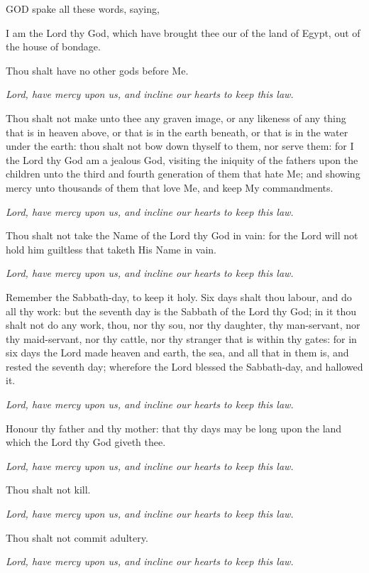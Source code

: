 GOD spake all these words, saying, \par
I am the Lord thy God, which have brought thee our of the land of Egypt, out of the house of bondage. \par
Thou shalt have no other gods before Me.

\textit{Lord, have mercy upon us, and incline our hearts to keep this law.}

Thou shalt not make unto thee any graven image, or any likeness of any thing that is in heaven above, or that is in the earth beneath, or that is in the water under the earth: thou shalt not bow down thyself to them, nor serve them: for I the Lord thy God am a jealous God, visiting the iniquity of the fathers upon the children unto the third and fourth generation of them that hate Me; and showing mercy unto thousands of them that love Me, and keep My commandments.

\textit{Lord, have mercy upon us, and incline our hearts to keep this law.}

Thou shalt not take the Name of the Lord thy God in vain: for the Lord will not hold him guiltless that taketh His Name in vain.

\textit{Lord, have mercy upon us, and incline our hearts to keep this law.}

Remember the Sabbath-day, to keep it holy.
Six days shalt thou labour, and do all thy work: but the seventh day is the Sabbath of the Lord thy God; in it thou shalt not do any work, thou, nor thy sou, nor thy daughter, thy man-servant, nor thy maid-servant, nor thy cattle, nor thy stranger that is within thy gates: for in six days the Lord made heaven and earth, the sea, and all that in them is, and rested the seventh day; wherefore the Lord blessed the Sabbath-day, and hallowed it.

\textit{Lord, have mercy upon us, and incline our hearts to keep this law.}

Honour thy father and thy mother: that thy days may be long upon the land which the Lord thy God giveth thee.

\textit{Lord, have mercy upon us, and incline our hearts to keep this law.}

Thou shalt not kill.

\textit{Lord, have mercy upon us, and incline our hearts to keep this law.}

Thou shalt not commit adultery.

\textit{Lord, have mercy upon us, and incline our hearts to keep this law.}


